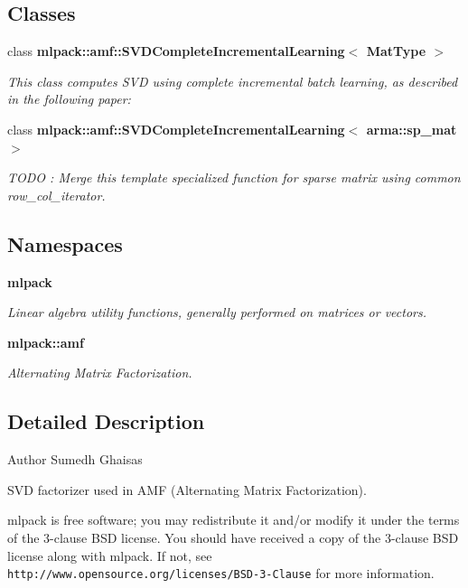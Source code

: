 \subsection*{Classes}
\begin{DoxyCompactItemize}
\item 
class {\bf mlpack\+::amf\+::\+S\+V\+D\+Complete\+Incremental\+Learning$<$ Mat\+Type $>$}
\begin{DoxyCompactList}\small\item\em This class computes S\+VD using complete incremental batch learning, as described in the following paper\+: \end{DoxyCompactList}\item 
class {\bf mlpack\+::amf\+::\+S\+V\+D\+Complete\+Incremental\+Learning$<$ arma\+::sp\+\_\+mat $>$}
\begin{DoxyCompactList}\small\item\em T\+O\+DO \+: Merge this template specialized function for sparse matrix using common row\+\_\+col\+\_\+iterator. \end{DoxyCompactList}\end{DoxyCompactItemize}
\subsection*{Namespaces}
\begin{DoxyCompactItemize}
\item 
 {\bf mlpack}
\begin{DoxyCompactList}\small\item\em Linear algebra utility functions, generally performed on matrices or vectors. \end{DoxyCompactList}\item 
 {\bf mlpack\+::amf}
\begin{DoxyCompactList}\small\item\em Alternating Matrix Factorization. \end{DoxyCompactList}\end{DoxyCompactItemize}


\subsection{Detailed Description}
\begin{DoxyAuthor}{Author}
Sumedh Ghaisas
\end{DoxyAuthor}
S\+VD factorizer used in A\+MF (Alternating Matrix Factorization).

mlpack is free software; you may redistribute it and/or modify it under the terms of the 3-\/clause B\+SD license. You should have received a copy of the 3-\/clause B\+SD license along with mlpack. If not, see {\tt http\+://www.\+opensource.\+org/licenses/\+B\+S\+D-\/3-\/\+Clause} for more information. 